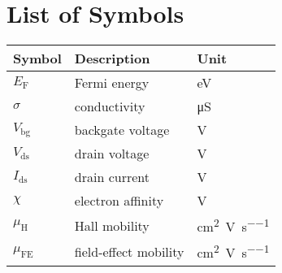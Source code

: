 \chapter*{List of Symbols}
\begin{longtable}[l]{p{70pt} p{150pt} p{150pt}} 
\toprule
\textbf{Symbol}	& \textbf{Description} & \textbf{Unit} \\ 
\midrule
$E_\mathrm{F}$  & Fermi energy & \si{\electronvolt}\\
$\sigma$ & conductivity & \si{\micro\siemens} \\
$V_\mathrm{bg}$ & backgate voltage & \si{\volt}\\
$V_\mathrm{ds}$ & drain voltage & \si{\volt}\\
$I_\mathrm{ds}$ & drain current & \si{\volt}\\
$\chi$ & electron affinity & \si{\volt}\\
$\mu_\mathrm{H}$ & Hall mobility & \si{\cm\squared\per\volt\per\second}\\
$\mu_\mathrm{FE}$ & field-effect mobility & \si{\cm\squared\per\volt\per\second}\\
\bottomrule
\end{longtable}
